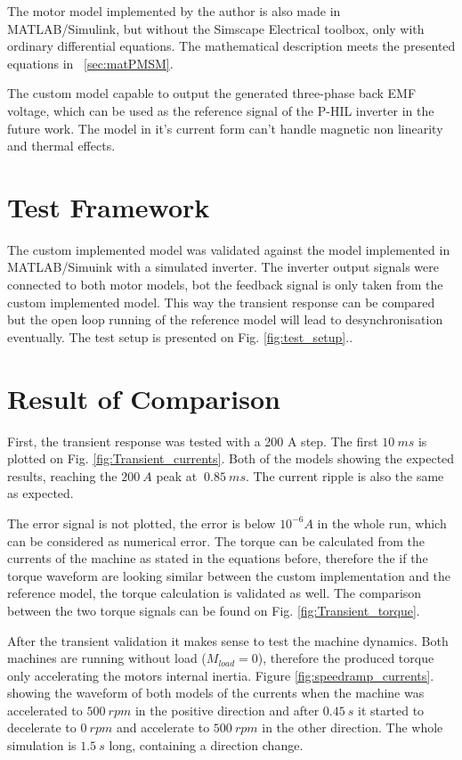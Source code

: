 \documentclass[twoside,b5paper,10pt]{article}
\begin{document}
The motor model implemented by the author is also made in MATLAB/Simulink, but without the Simscape Electrical toolbox, only with ordinary differential equations. The mathematical description meets the presented equations in \sectionname~\ref{sec:matPMSM}.


The custom model capable to output the generated three-phase back EMF voltage, which can be used as the reference signal of the P-HIL inverter in the future work. The model in it's current form can't handle magnetic non linearity and thermal effects. 

\section{Test Framework}
\label{sec:test_framework}
The custom implemented model was validated against the model implemented in MATLAB/Simuink with a simulated inverter. The inverter output signals were connected to both motor models, bot the feedback signal is only taken from the custom implemented model. This way the transient response can be compared but the open loop running of the reference model will lead to desynchronisation eventually. The test setup is presented on Fig. \ref{fig:test_setup}..




\section{Result of Comparison}
\label{sec:results}
First, the transient response was tested with a 200 A step. The first $10\ ms$ is plotted on Fig. \ref{fig:Transient_currents}. Both of the models showing the expected results, reaching the $200\ A$ peak at $~0.85\ ms$. The current ripple is also the same as expected.



The error signal is not plotted, the error is below $10^{-6} A$ in the whole run, which can be considered as numerical error. The torque can be calculated from the currents of the machine as stated in the equations before, therefore the if the torque waveform are looking similar between the custom implementation and the reference model, the torque calculation is validated as well. The comparison between the two torque signals can be found on Fig. \ref{fig:Transient_torque}.



After the transient validation it makes sense to test the machine dynamics. Both machines are running without load ($M_{load}=0$), therefore the produced torque only accelerating the motors internal inertia. Figure \ref{fig:speedramp_currents}. showing the waveform of both models of the currents when the machine was accelerated to $500\ rpm$ in the positive direction and after $0.45\ s$ it started to decelerate to $0\ rpm$ and accelerate to $500\ rpm$ in the other direction. The whole simulation is $1.5\ s$ long, containing a direction change.
\end{document}
